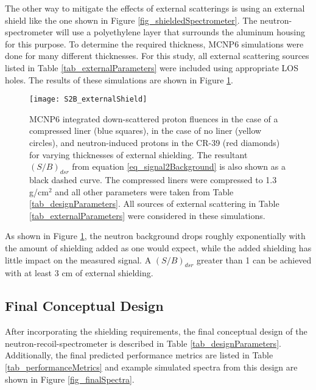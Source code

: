 The other way to mitigate the effects of external scatterings is using an external shield like the one shown in Figure \ref{fig_shieldedSpectrometer}. The neutron-spectrometer will use a polyethylene layer that surrounds the aluminum housing for this purpose. To determine the required thickness, MCNP6 simulations were done for many different thicknesses. For this study, all external scattering sources listed in Table \ref{tab_externalParameters} were included using appropriate LOS holes. The results of these simulations are shown in Figure \ref{fig_externalShielding}.

\begin{figure}[h!]
	
	\centering
	\texttt{[image: S2B\_externalShield]}
	\caption{MCNP6 integrated down-scattered proton fluences in the case of a compressed liner (blue squares), in the case of no liner (yellow circles), and neutron-induced protons in the CR-39 (red diamonds) for varying thicknesses of external shielding. The resultant $(S/B)_{dsr}$ from equation \ref{eq_signal2Background} is also shown as a black dashed curve. The compressed liners were compressed to 1.3 g/cm$^2$ and all other parameters were taken from Table \ref{tab_designParameters}. All sources of external scattering in Table \ref{tab_externalParameters} were considered in these simulations.}
	\label{fig_externalShielding}
	
\end{figure}

As shown in Figure \ref{fig_externalShielding}, the neutron background drops roughly exponentially with the amount of shielding added as one would expect, while the added shielding has little impact on the measured signal. A $(S/B)_{dsr}$ greater than 1 can be achieved with at least 3 cm of external shielding.

\subsection{Final Conceptual Design}

After incorporating the shielding requirements, the final conceptual design of the neutron-recoil-spectrometer is described in Table \ref{tab_designParameters}. Additionally, the final predicted performance metrics are listed in Table \ref{tab_performanceMetrics} and example simulated spectra from this design are shown in Figure \ref{fig_finalSpectra}. 

